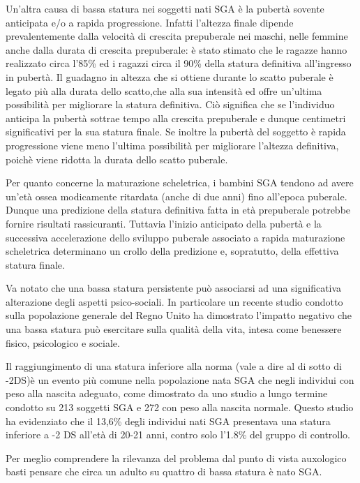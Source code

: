 Un'altra causa di bassa statura nei soggetti nati SGA è la pubertà sovente anticipata e/o a rapida progressione\cite{albertsson2000children}. 
Infatti l'altezza finale dipende prevalentemente dalla velocità di crescita prepuberale nei maschi, nelle femmine anche dalla durata di crescita prepuberale: è stato stimato che le ragazze hanno realizzato circa l'85\% ed i ragazzi circa il 90\% della statura definitiva all'ingresso in pubertà. Il guadagno in altezza che si ottiene durante lo scatto puberale è legato più alla durata dello scatto,che alla sua intensità ed offre un'ultima possibilità per migliorare la statura definitiva\cite{gasser1985human}. Ciò significa che se l'individuo anticipa la pubertà sottrae tempo alla crescita prepuberale e dunque centimetri significativi per la sua statura finale. Se inoltre la pubertà del soggetto è rapida progressione viene meno l'ultima possibilità per migliorare l'altezza definitiva, poichè viene ridotta la durata dello scatto puberale. 

Per quanto concerne la maturazione scheletrica, i bambini SGA tendono ad avere un'età ossea modicamente ritardata (anche di due anni) fino all'epoca puberale. Dunque una predizione della statura definitiva fatta in età prepuberale potrebbe fornire risultati rassicuranti. Tuttavia l'inizio anticipato della pubertà e la successiva accelerazione dello sviluppo puberale associato a rapida maturazione scheletrica determinano un crollo della predizione e, sopratutto, della effettiva statura finale\cite{job1986histoire}.

Va notato che una bassa statura persistente può associarsi ad una significativa alterazione degli aspetti psico-sociali. In particolare un recente studio condotto sulla popolazione generale del Regno Unito ha dimostrato l'impatto negativo che una bassa statura può esercitare sulla qualità della vita, intesa come benessere fisico, psicologico e sociale\cite{christensen2007evaluation}. 
 
Il raggiungimento di una statura inferiore alla norma (vale a dire al di sotto di -2DS)è un evento più comune nella popolazione nata SGA che negli individui con peso alla nascita adeguato, come dimostrato da uno studio a lungo termine condotto su 213 soggetti SGA e 272 con peso alla nascita normale. Questo studio ha evidenziato che il 
13,6\% degli individui nati SGA presentava una statura inferiore a -2 DS all'età di
20-21 anni, contro solo l'1.8\% del gruppo di controllo.\cite{leger1997reduced}

Per meglio comprendere la rilevanza del problema dal punto di vista auxologico basti pensare che circa un adulto su quattro di bassa statura è nato SGA.
  



  


 










